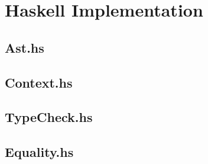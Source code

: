\section{Haskell Implementation}
\subsection{Ast.hs}
\subsection{Context.hs}
\subsection{TypeCheck.hs}
\subsection{Equality.hs}\label{equal}